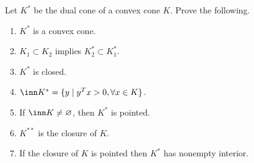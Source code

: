 \documentclass{ctexart}
\begin{document}
\begin{problem}\label{pro:2.31}
  Let \(K^*\) be the dual cone of a convex cone \(K \). Prove the following.
  \begin{enumerate}
    \item \(K^* \) is a convex cone.
    \item \(K_1 \subset K_2 \) implies \(K_2^* \subset K_1^* \).
    \item \(K^* \) is closed.
    \item \( \inn  K^* =\{y \mid y^T x >0, \forall x \in K\} \).
    \item If \( \inn  K  \neq \varnothing\), then \(K^* \) is pointed.
    \item \(K^{**} \) is the closure of \(K \).
    \item If the closure of \(K \) is pointed then \(K^* \) has nonempty interior.
  \end{enumerate}
\end{problem}
\end{document}
